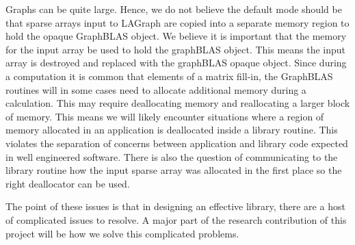 Graphs can be quite large.   Hence, we do not believe the default mode should be that 
sparse arrays input to LAGraph are copied into a separate memory region to hold the 
opaque GraphBLAS object.  We believe it is important that the memory for the input array
be used to hold the graphBLAS object. This means the input array is destroyed and replaced
with the graphBLAS opaque object.  Since during a computation it is common that elements of a
matrix fill-in, the GraphBLAS routines will in some cases need to allocate additional memory during a 
calculation.  This may require deallocating memory and reallocating a larger block of memory.
This means we will likely encounter situations where a region of memory allocated in an application
is deallocated inside a library routine.  This violates the separation of concerns between application
and library code expected in well engineered software. There is also the question of communicating
to the library routine how the input sparse array was allocated in the first place so the right deallocator 
can be used.

The point of these issues is that in designing an effective library, there are a host of 
complicated issues to resolve.  A major part of the research contribution of this project will
be how we solve this complicated problems.


